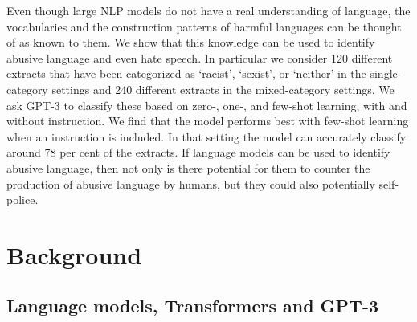 \documentclass{bmcart}
\begin{document}
Even though large NLP models do not have a real understanding of language, the vocabularies and the construction patterns of harmful languages can be thought of as known to them. We show that this knowledge can be used to identify abusive language and even hate speech. In particular we consider 120 different extracts that have been categorized as `racist', `sexist', or `neither' in the single-category settings and 240 different extracts in the mixed-category settings. We ask GPT-3 to classify these based on zero-, one-, and few-shot learning, with and without instruction. We find that the model performs best with few-shot learning when an instruction is included. In that setting the model can accurately classify around 78 per cent of the extracts. If language models can be used to identify abusive language, then not only is there potential for them to counter the production of abusive language by humans, but they could also potentially self-police.

\section{Background}\label{background}

\subsection{Language models, Transformers and GPT-3}\label{language-models-transformers-and-gpt-3}
\end{document}
